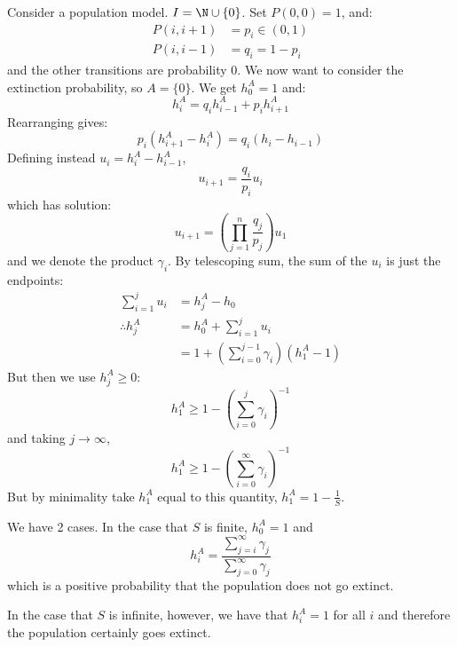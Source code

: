 \documentclass[../Main.tex]{subfiles}
\begin{document}
\begin{example}
    Consider a population model. $I = \N \cup \{0\}$. Set $P(0, 0) = 1$, and:
    \begin{align*}
        P(i, i+1) &=p_i \in (0, 1) \\
        P(i, i-1) &= q_i = 1- p_i
    \end{align*}
    and the other transitions are probability $0$. We now want to consider the extinction probability, so $A = \{0\}$. We get $h_0^A = 1$ and:
    \begin{equation*}
        h_{i}^A = q_i h_{i-1}^A + p_i h_{i+1}^A
    \end{equation*}
    Rearranging gives:
    \begin{equation*}
        p_i (h_{i+1}^A - h_i^A) = q_i (h_i - h_{i-1})
    \end{equation*}
    Defining instead $u_i = h_{i}^A - h_{i-1}^A$,
    \begin{equation*}
        u_{i+1} = \frac{q_i}{p_i}u_i
    \end{equation*}
    which has solution:
    \begin{equation*}
        u_{i+1} = \left(\prod_{j=1}^{n}\frac{q_j}{p_j}\right)u_1
    \end{equation*}
    and we denote the product $\gamma_i$. By telescoping sum, the sum of the $u_i$ is just the endpoints:
    \begin{align*}
        \sum_{i=1}^{j}u_i &= h_j^A - h_0 \\
        \therefore h_j^A &= h_0^A + \sum_{i=1}^j u_i \\
        &= 1 + \left(\sum_{i=0}^{j-1}\gamma_i\right)(h_1^A - 1)
    \end{align*}
    But then we use $h_j^A \geq 0$:
    \begin{equation*}
        h_1^A \geq 1 - \left(\sum_{i=0}^{j}\gamma_i\right)^{-1}
    \end{equation*}
    and taking $j \to \infty$,
    \begin{equation*}
        h_1^A \geq 1 - \left(\sum_{i=0}^{\infty}\gamma_i\right)^{-1}
    \end{equation*}
    But by minimality take $h_1^A$ equal to this quantity, $h_1^A = 1 - \frac{1}{S}$.

    We have 2 cases. In the case that $S$ is finite, $h_0^A = 1$ and
    \begin{equation*}
        h_i^A = \frac{\sum_{j=i}^{\infty} \gamma_j}{\sum_{j=0}^{\infty}\gamma_j}
    \end{equation*}
    which is a positive probability that the population does not go extinct.

    In the case that $S$ is infinite, however, we have that $h_i^A = 1$ for all $i$ and therefore the population certainly goes extinct.
\end{example}
\end{document}
